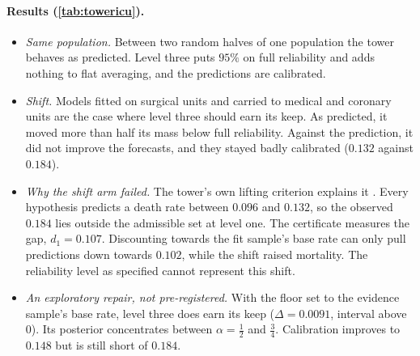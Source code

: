 \documentclass[11pt]{article}
\theoremstyle{definition}
\theoremstyle{remark}
\begin{document}
\paragraph{Results (\cref{tab:towericu}).}
\begin{itemize}[leftmargin=*,nosep]
\item \emph{Same population.} Between two random halves of one population the tower behaves as predicted. Level three puts $95\%$ on
  full reliability and adds nothing to flat averaging, and the predictions are calibrated.
\item \emph{Shift.} Models fitted on surgical units and carried to medical and coronary units are the case where level three should
  earn its keep. As predicted, it moved more than half its mass below full reliability. Against the prediction, it did not improve the
  forecasts, and they stayed badly calibrated ($0.132$ against $0.184$).
\item \emph{Why the shift arm failed.} The tower's own lifting criterion explains it \cite[Thm.~10.5, Thm.~10.8]{Tower}. Every
  hypothesis predicts a death rate between $0.096$ and $0.132$, so the observed $0.184$ lies outside the admissible set at level one.
  The certificate measures the gap, $d_1=0.107$. Discounting towards the fit sample's base rate can only pull predictions down towards
  $0.102$, while the shift raised mortality. The reliability level as specified cannot represent this shift.
\item \emph{An exploratory repair, not pre-registered.} With the floor set to the evidence sample's base rate, level three does earn its
  keep ($\Delta=0.0091$, interval above $0$). Its posterior concentrates between $\alpha=\frac12$ and $\frac34$. Calibration improves to
  $0.148$ but is still short of $0.184$.
\end{itemize}
\end{document}
